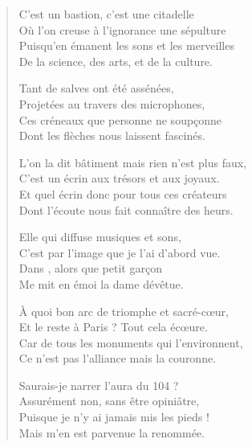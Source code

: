 \begin{verse}%
  \quatrain%
  C’est un bastion, c’est une citadelle\\  %
  Où l’on creuse à l’ignorance une sépulture\\  %
  Puisqu’en émanent les sons et les merveilles\\  %
  De la science, des arts, et de la culture.

  Tant de salves ont été assénées,\\  %
  Projetées au travers des microphones,\\  %
  Ces créneaux que personne ne soupçonne\\  %
  Dont les flèches nous laissent fascinés.

  L’on la dit bâtiment mais rien n’est plus faux,\\  %
  C’est un écrin aux trésors et aux joyaux.\\  %
  Et quel écrin donc pour tous ces créateurs\\  %
  Dont l’écoute nous fait connaître des heurs.

  Elle qui diffuse musiques et sons,\\  %
  C’est par l’image que je l’ai d’abord vue.\\  %
  Dans , alors que petit garçon\\
  Me mit en émoi la dame dévêtue.

  À quoi bon arc de triomphe et sacré-cœur,\\  %
  Et le reste à Paris ? Tout cela écœure.\\  %
  Car de tous les monuments qui l’environnent,\\  %
  Ce n’est pas l’alliance mais la couronne.

  Saurais-je narrer l’aura du 104 ?\\  %
  Assurément non, sans être opiniâtre,\\  %
  Puisque je n’y ai jamais mis les pieds !\\  %
  Mais m’en est parvenue la renommée.


\end{verse}
